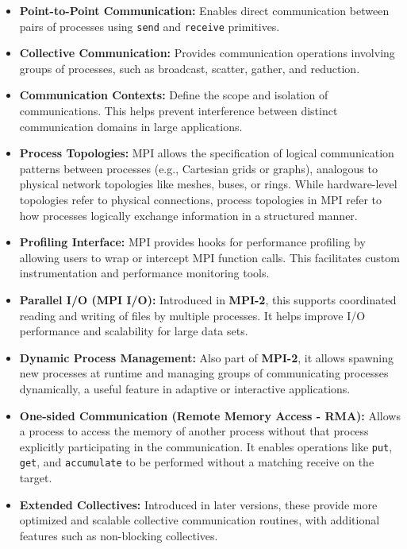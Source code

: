 \documentclass[12pt]{book}
\begin{document}
\begin{itemize}
    \item \textbf{Point-to-Point Communication:} Enables direct communication between pairs of processes using \texttt{send} and \texttt{receive} primitives.

    \item \textbf{Collective Communication:} Provides communication operations involving groups of processes, such as broadcast, scatter, gather, and reduction.

    \item \textbf{Communication Contexts:} Define the scope and isolation of communications. This helps prevent interference between distinct communication domains in large applications.

    \item \textbf{Process Topologies:} MPI allows the specification of logical communication patterns between processes (e.g., Cartesian grids or graphs), analogous to physical network topologies like meshes, buses, or rings. While hardware-level topologies refer to physical connections, process topologies in MPI refer to how processes logically exchange information in a structured manner.

    \item \textbf{Profiling Interface:} MPI provides hooks for performance profiling by allowing users to wrap or intercept MPI function calls. This facilitates custom instrumentation and performance monitoring tools.

    \item \textbf{Parallel I/O (MPI I/O):} Introduced in \textbf{MPI-2}, this supports coordinated reading and writing of files by multiple processes. It helps improve I/O performance and scalability for large data sets.

    \item \textbf{Dynamic Process Management:} Also part of \textbf{MPI-2}, it allows spawning new processes at runtime and managing groups of communicating processes dynamically, a useful feature in adaptive or interactive applications.

    \item \textbf{One-sided Communication (Remote Memory Access - RMA):} Allows a process to access the memory of another process without that process explicitly participating in the communication. It enables operations like \texttt{put}, \texttt{get}, and \texttt{accumulate} to be performed without a matching receive on the target.

    \item \textbf{Extended Collectives:} Introduced in later versions, these provide more optimized and scalable collective communication routines, with additional features such as non-blocking collectives.
\end{itemize}
\end{document}
